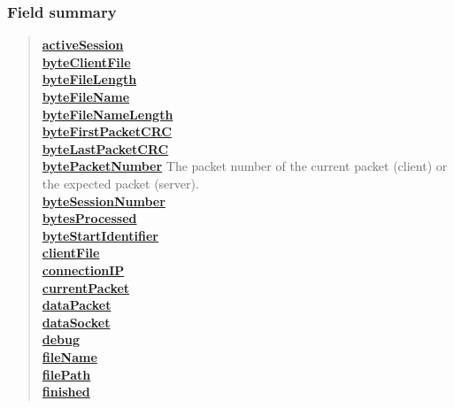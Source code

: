 {{{{\subsubsection{Field summary}{
\begin{verse}
\hyperlink{filetransferUDP.FileTransfer.activeSession}{{\bf activeSession}} \\
\hyperlink{filetransferUDP.FileTransfer.byteClientFile}{{\bf byteClientFile}} \\
\hyperlink{filetransferUDP.FileTransfer.byteFileLength}{{\bf byteFileLength}} \\
\hyperlink{filetransferUDP.FileTransfer.byteFileName}{{\bf byteFileName}} \\
\hyperlink{filetransferUDP.FileTransfer.byteFileNameLength}{{\bf byteFileNameLength}} \\
\hyperlink{filetransferUDP.FileTransfer.byteFirstPacketCRC}{{\bf byteFirstPacketCRC}} \\
\hyperlink{filetransferUDP.FileTransfer.byteLastPacketCRC}{{\bf byteLastPacketCRC}} \\
\hyperlink{filetransferUDP.FileTransfer.bytePacketNumber}{{\bf bytePacketNumber}} The packet number of the current packet (client) or the expected packet (server).\\
\hyperlink{filetransferUDP.FileTransfer.byteSessionNumber}{{\bf byteSessionNumber}} \\
\hyperlink{filetransferUDP.FileTransfer.bytesProcessed}{{\bf bytesProcessed}} \\
\hyperlink{filetransferUDP.FileTransfer.byteStartIdentifier}{{\bf byteStartIdentifier}} \\
\hyperlink{filetransferUDP.FileTransfer.clientFile}{{\bf clientFile}} \\
\hyperlink{filetransferUDP.FileTransfer.connectionIP}{{\bf connectionIP}} \\
\hyperlink{filetransferUDP.FileTransfer.currentPacket}{{\bf currentPacket}} \\
\hyperlink{filetransferUDP.FileTransfer.dataPacket}{{\bf dataPacket}} \\
\hyperlink{filetransferUDP.FileTransfer.dataSocket}{{\bf dataSocket}} \\
\hyperlink{filetransferUDP.FileTransfer.debug}{{\bf debug}} \\
\hyperlink{filetransferUDP.FileTransfer.fileName}{{\bf fileName}} \\
\hyperlink{filetransferUDP.FileTransfer.filePath}{{\bf filePath}} \\
\hyperlink{filetransferUDP.FileTransfer.finished}{{\bf finished}} \\

\end{verse}}}}}}
